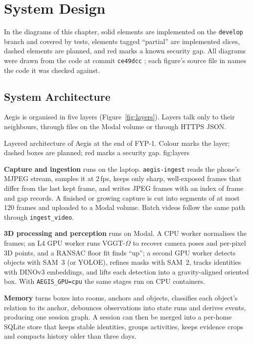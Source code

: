 \chapter{System Design}
\label{chap:design}
In the diagrams of this chapter, solid elements are implemented on the
\texttt{develop} branch and covered by tests, elements tagged ``partial'' are
implemented slices, dashed elements are planned, and red marks a known security
gap. All diagrams were drawn from the code at commit \texttt{ce49dcc}
; each figure's source file in
 names the code it was checked against.

\section{System Architecture}
\label{sec:architecture}
Aegis is organised in five layers (Figure~\ref{fig:layers}). Layers talk only to
their neighbours, through files on the Modal volume or through HTTPS JSON.

  {Layered architecture of Aegis at the end of FYP-1. Colour marks the layer;
   dashed boxes are planned; red marks a security gap.}
  {fig:layers}

\textbf{Capture and ingestion} runs on the laptop. \texttt{aegis-ingest} reads
the phone's MJPEG stream, samples it at 2\,fps, keeps only sharp, well-exposed
frames that differ from the last kept frame, and writes JPEG frames with an
index of frame and gap records. A finished or growing capture is cut into
segments of at most 120 frames and uploaded to a Modal volume. Batch videos
follow the same path through \texttt{ingest\_video}.

\textbf{3D processing and perception} runs on Modal. A CPU worker normalises
the frames; an L4 GPU worker runs VGGT-$\Omega$ to recover camera poses and
per-pixel 3D points, and a RANSAC floor fit finds ``up''; a second GPU worker
detects objects with SAM~3 (or YOLOE), refines masks with SAM~2, tracks
identities with DINOv3 embeddings, and lifts each detection into a
gravity-aligned oriented box. With \texttt{AEGIS\_GPU=cpu} the same stages run
on CPU containers.

\textbf{Memory} turns boxes into rooms, anchors and objects, classifies each
object's relation to its anchor, debounces observations into state runs and
derives events, producing one session graph. A session can then be merged into
a per-home SQLite store that keeps stable identities, groups activities, keeps
evidence crops and compacts history older than three days.

